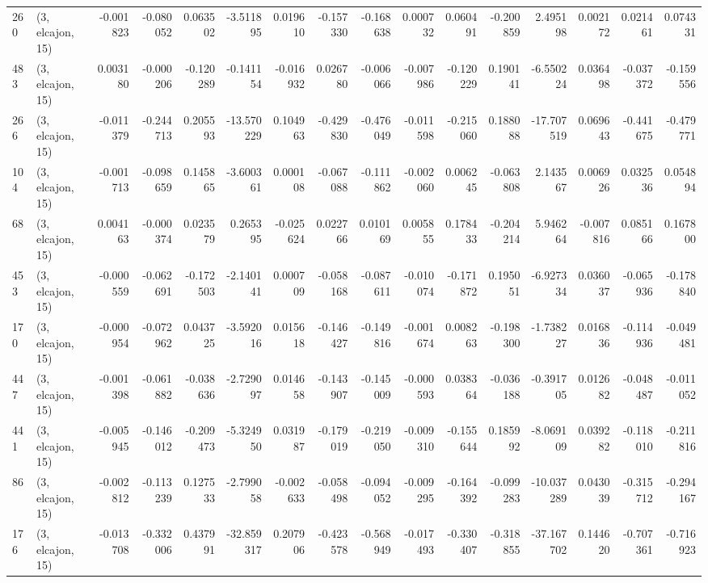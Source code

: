\begin{tabular}{llrrrrrrrrrrrrrr}
260 &  (3, elcajon, 15) &  -0.001823 & -0.080052 &  0.063502 &   -3.511895 &  0.019610 &  -0.157330 & -0.168638 &  0.000732 &  0.060491 & -0.200859 &    2.495198 &  0.002172 &  0.021461 &  0.074331 \\
483 &  (3, elcajon, 15) &   0.003180 & -0.000206 & -0.120289 &   -0.141154 & -0.016932 &   0.026780 & -0.006066 & -0.007986 & -0.120229 &  0.190141 &   -6.550224 &  0.036498 & -0.037372 & -0.159556 \\
266 &  (3, elcajon, 15) &  -0.011379 & -0.244713 &  0.205593 &  -13.570229 &  0.104963 &  -0.429830 & -0.476049 & -0.011598 & -0.215060 &  0.188088 &  -17.707519 &  0.069643 & -0.441675 & -0.479771 \\
104 &  (3, elcajon, 15) &  -0.001713 & -0.098659 &  0.145865 &   -3.600361 &  0.000108 &  -0.067088 & -0.111862 & -0.002060 &  0.006245 & -0.063808 &    2.143567 &  0.006926 &  0.032536 &  0.054894 \\
68  &  (3, elcajon, 15) &   0.004163 & -0.000374 &  0.023579 &    0.265395 & -0.025624 &   0.022766 &  0.010169 &  0.005855 &  0.178433 & -0.204214 &    5.946264 & -0.007816 &  0.085166 &  0.167800 \\
453 &  (3, elcajon, 15) &  -0.000559 & -0.062691 & -0.172503 &   -2.140141 &  0.000709 &  -0.058168 & -0.087611 & -0.010074 & -0.171872 &  0.195051 &   -6.927334 &  0.036037 & -0.065936 & -0.178840 \\
170 &  (3, elcajon, 15) &  -0.000954 & -0.072962 &  0.043725 &   -3.592016 &  0.015618 &  -0.146427 & -0.149816 & -0.001674 &  0.008263 & -0.198300 &   -1.738227 &  0.016836 & -0.114936 & -0.049481 \\
447 &  (3, elcajon, 15) &  -0.001398 & -0.061882 & -0.038636 &   -2.729097 &  0.014658 &  -0.143907 & -0.145009 & -0.000593 &  0.038364 & -0.036188 &   -0.391705 &  0.012682 & -0.048487 & -0.011052 \\
441 &  (3, elcajon, 15) &  -0.005945 & -0.146012 & -0.209473 &   -5.324950 &  0.031987 &  -0.179019 & -0.219050 & -0.009310 & -0.155644 &  0.185992 &   -8.069109 &  0.039282 & -0.118010 & -0.211816 \\
86  &  (3, elcajon, 15) &  -0.002812 & -0.113239 &  0.127533 &   -2.799058 & -0.002633 &  -0.058498 & -0.094052 & -0.009295 & -0.164392 & -0.099283 &  -10.037289 &  0.043039 & -0.315712 & -0.294167 \\
176 &  (3, elcajon, 15) &  -0.013708 & -0.332006 &  0.437991 &  -32.859317 &  0.207906 &  -0.423578 & -0.568949 & -0.017493 & -0.330407 & -0.318855 &  -37.167702 &  0.144620 & -0.707361 & -0.716923 \\

\end{tabular}
